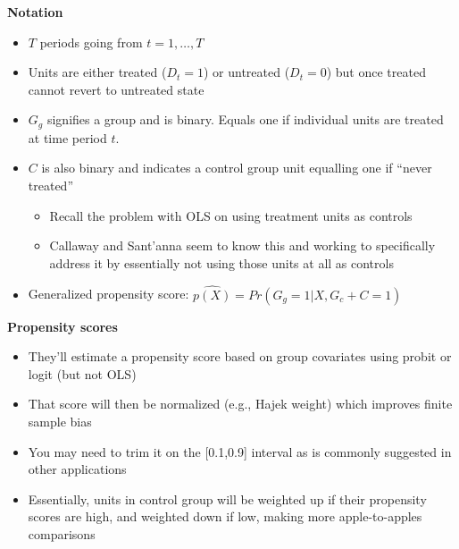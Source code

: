 \documentclass[notes=show]{beamer}
\begin{document}
\begin{frame}[plain]
\begin{center}
\textbf{Notation}
\end{center}

\begin{itemize}
\item $T$ periods going from $t=1, \dots, T$
\item Units are either treated ($D_t=1$) or untreated ($D_t=0$) but once treated cannot revert to untreated state
\item $G_g$ signifies a group and is binary.  Equals one if individual units are treated at time period $t$.
\item $C$ is also binary and indicates a control group unit equalling one if ``never treated''
	\begin{itemize}
	\item Recall the problem with OLS on using treatment units as controls
	\item Callaway and Sant'anna seem to know this and working to specifically address it by essentially not using those units at all as controls
	\end{itemize}
\item Generalized propensity score: $\hat{p(X)} = Pr(G_g=1 | X,G_c+C=1)$
\end{itemize}

\end{frame}


\begin{frame}[plain]
\begin{center}
\textbf{Propensity scores}
\end{center}

\begin{itemize}
\item They'll estimate a propensity score based on group covariates using probit or logit (but not OLS)
\item That score will then be normalized (e.g., Hajek weight) which improves finite sample bias
\item You may need to trim it on the [0.1,0.9] interval as is commonly suggested in other applications
\item Essentially, units in control group will be weighted up if their propensity scores are high, and weighted down if low, making more apple-to-apples comparisons
\end{itemize}

\end{frame}
\end{document}
